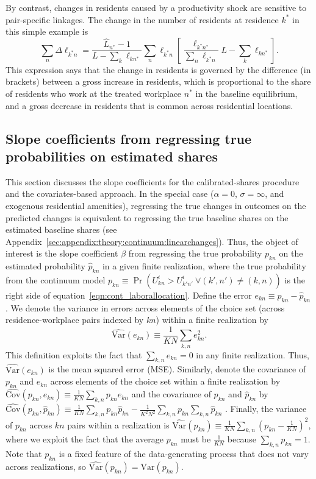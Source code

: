 \documentclass[11pt]{article}
\theoremstyle{definition}
\begin{document}
By contrast, changes in residents caused by a productivity shock are sensitive to pair-specific linkages.
The change in the number of residents at residence $k^{*}$ in this simple example is
\begin{equation*}
\sum_{n} \Delta {\ell}_{k^{*}n}
=
\frac{\hat{L}_{n^{*}}  - 1}{L - \sum_{k}\ell_{kn^{*}}} \sum_{n} \ell_{k^{*}n}
\left[\frac{\ell_{k^{*} n^{*}}}{\sum_{n} \ell_{k^{*}n}} L  - \sum_{k}\ell_{kn^{*}} \right]
.\end{equation*}
This expression says that the change in residents is governed by the difference (in brackets)
between a gross increase in residents,
which is proportional to  the share of residents who work at the treated workplace $n^{*}$ in the baseline equilibrium,
and a gross decrease in residents that is common across residential locations.

\subsection{Slope coefficients from regressing true probabilities on estimated shares}\label{sec:appendix:theory:TWFE:slopecoefficient}

This section discusses the slope coefficients for the calibrated-shares procedure and the covariates-based approach.
In the special case ($\alpha = 0$, $\sigma = \infty$, and exogenous residential amenities),
regressing the true changes in outcomes on the predicted changes is equivalent to regressing the true baseline shares on the estimated baseline shares (see Appendix~\ref{sec:appendix:theory:continuum:linearchanges}).
Thus, the object of interest is the slope coefficient $\beta$ from regressing the true probability $p_{kn}$ on the estimated probability $\hat{p}_{kn}$ in a given finite realization,
where the true probability from the continuum model $p_{kn} \equiv \Pr(U_{kn}^{i} > U_{k'n'}^{i} \ \forall (k',n') \neq (k,n))$ is the right side of equation~\eqref{eqn:cont_laborallocation}.
Define the error $e_{kn} \equiv p_{kn} - \hat{p}_{kn}$.
We denote the variance in errors across elements of the choice set (across residence-workplace pairs indexed by $kn$) within a finite realization by
$$
\widehat{\text{Var}}(e_{kn})
\equiv
\frac{1}{KN} \sum_{k,n} e_{kn}^{2}
.$$
This definition exploits the fact that $\sum_{k,n} e_{kn} = 0$ in any finite realization.
Thus, $\widehat{\text{Var}}(e_{kn})$ is the mean squared error (MSE).
Similarly, denote the covariance of $p_{kn}$ and $e_{kn}$ across elements of the choice set within a finite realization by
$
\widehat{\text{Cov}}(p_{kn},e_{kn})
\equiv
\frac{1}{KN} \sum_{k,n} p_{kn} e_{kn}
$
and the covariance of $p_{kn}$ and $\hat{p}_{kn}$ by
$
\widehat{\text{Cov}}(p_{kn},\hat{p}_{kn})
\equiv
\frac{1}{KN} \sum_{k,n} p_{kn} \hat{p}_{kn}
-
\frac{1}{K^2 N^2} \sum_{k,n} p_{kn} \sum_{k,n} \hat{p}_{kn}
$
.
Finally, the variance of $p_{kn}$ across $kn$ pairs within a realization is 
$\widehat{\text{Var}}(p_{kn}) \equiv \frac{1}{KN} \sum_{k,n} \left(p_{kn} - \frac{1}{KN}\right)^2$,
where we exploit the fact that the average $p_{kn}$ must be $\frac{1}{KN}$ because $\sum_{k,n} p_{kn} = 1$.
Note that $p_{kn}$ is a fixed feature of the data-generating process that does not vary across realizations,
so $\widehat{\text{Var}}(p_{kn}) = \text{Var}(p_{kn})$.
\end{document}
